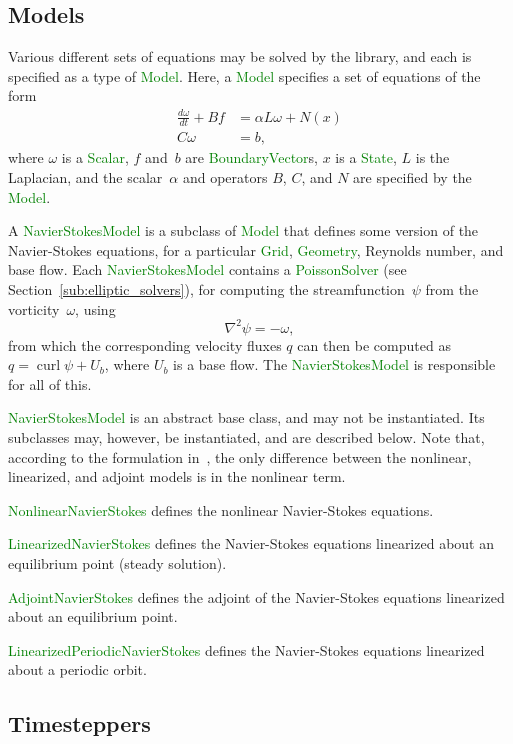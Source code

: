 \documentclass[11pt]{article}
\def\class#1{\textcolor{green}{\bf #1}}
\def\class#1{\textcolor{green}{\ttfamily\small #1}} %
\begin{document}
\subsection{Models}
\label{sub:models}
Various different sets of equations may be solved by the library, and each is specified as a type of \class{Model}.  Here, a \class{Model} specifies a set of equations of the form
\begin{equation}
\begin{aligned}
    \frac{d\omega}{dt} + Bf &= \alpha L\omega + N(x)\\
    C\omega &= b,
\end{aligned}
\label{eq:model}
\end{equation}
where $\omega$ is a \class{Scalar}, $f$ and~$b$ are \class{BoundaryVector}s, $x$ is a \class{State}, $L$ is the Laplacian, and the scalar~$\alpha$ and operators $B$, $C$, and $N$ are specified by the \class{Model}.

A \class{NavierStokesModel} is a subclass of \class{Model} that defines some version of the Navier-Stokes equations, for a particular \class{Grid}, \class{Geometry}, Reynolds number, and base flow.  Each \class{NavierStokesModel} contains a \class{PoissonSolver} (see Section~\ref{sub:elliptic_solvers}), for computing the streamfunction~$\psi$ from the vorticity~$\omega$, using
\[
	\nabla^2 \psi = -\omega,
\]
from which the corresponding velocity fluxes $q$ can then be computed as $q = \operatorname{curl} \psi + U_b$, where $U_b$ is a base flow.  The \class{NavierStokesModel} is responsible for all of this.

\class{NavierStokesModel} is an abstract base class, and may not be instantiated.  Its subclasses may, however, be instantiated, and are described below.  Note that, according to the formulation in~\cite{AhuRow-08}, the only difference between the nonlinear, linearized, and adjoint models is in the nonlinear term.

\class{NonlinearNavierStokes} defines the nonlinear Navier-Stokes equations.

\class{LinearizedNavierStokes} defines the Navier-Stokes equations linearized about an equilibrium point (steady solution).

\class{AdjointNavierStokes} defines the adjoint of the Navier-Stokes equations linearized about an equilibrium point.

\class{LinearizedPeriodicNavierStokes} defines the Navier-Stokes equations linearized about a periodic orbit.

\subsection{Timesteppers}
\label{sub:timesteppers}
\end{document}
